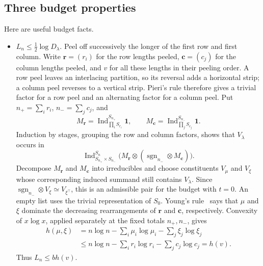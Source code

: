\subsection{Three budget properties}
Here are useful budget facts.
\begin{itemize}
\item \(L_n\le\frac12\log D_\lambda\).
Peel off successively the longer of the first row and first column.
Write $\mathbf r=(r_i)$ for the row lengths peeled, $\mathbf c=(c_j)$ for the column
lengths peeled, and $v$ for all these lengths in their peeling order.
A row peel leaves an interlacing partition, so its reversal adds
a horizontal strip; a column peel reverses to a vertical strip.
Pieri's rule therefore gives a trivial factor for a row peel and
an alternating factor for a column peel. Put
$n_+=\sum_i r_i$, $n_-=\sum_j c_j$, and
\[
 M_{\mathbf r}=\operatorname{Ind}_{\prod_i S_{r_i}}^{S_{n_+}}\mathbf1,
 \qquad
 M_{\mathbf c}=\operatorname{Ind}_{\prod_j S_{c_j}}^{S_{n_-}}\mathbf1.
\]
Induction by stages, grouping the row and column factors, shows that
$V_\lambda$ occurs in
\[
 \operatorname{Ind}_{S_{n_+}\times S_{n_-}}^{S_n}
   \bigl(M_{\mathbf r}\otimes
         (\operatorname{sgn}_{n_-}\otimes M_{\mathbf c})\bigr).
\]
Decompose $M_{\mathbf r}$ and $M_{\mathbf c}$ into irreducibles and choose constituents
$V_\mu$ and $V_\xi$ whose corresponding induced summand still
contains $V_\lambda$. Since
$\operatorname{sgn}_{n_-}\otimes V_\xi\simeq V_{\xi^\top}$,
this is an admissible pair for the budget with $t=0$.
An empty list uses the trivial representation of $S_0$.
Young's rule~\cite[14.1, pp.~51--52]{James1978}
says that $\mu$ and $\xi$ dominate the decreasing
rearrangements of $\mathbf r$ and $\mathbf c$, respectively. Convexity of
$x\log x$, applied separately at the fixed totals $n_+,n_-$, gives
\[
 \begin{aligned}
 h(\mu,\xi)
 &=n\log n-\sum_i\mu_i\log\mu_i-\sum_j\xi_j\log\xi_j\\
 &\le n\log n-\sum_i r_i\log r_i-\sum_j c_j\log c_j
 =h(v).
 \end{aligned}
\]
Thus $L_n\le b h(v)$.


\end{itemize}
